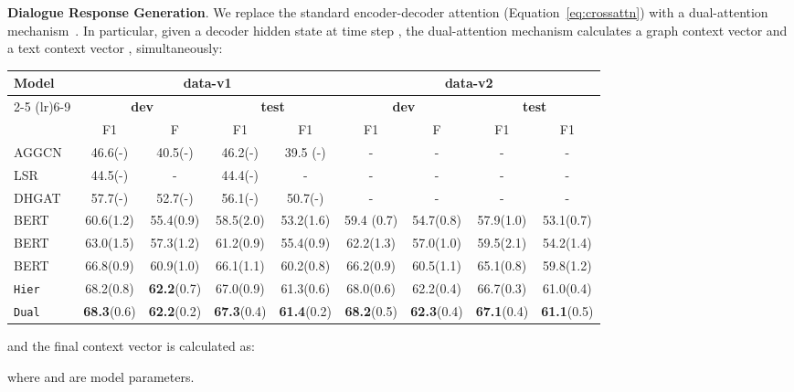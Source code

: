 \documentclass[11pt,a4paper]{article}
\begin{document}
\noindent\textbf{Dialogue Response Generation}.
We replace the standard encoder-decoder attention (Equation~\ref{eq:crossattn}) with a dual-attention mechanism~\cite{song2019semantic}. 
In particular, given a decoder hidden state  at time step , the dual-attention mechanism calculates a graph context vector  and a text context vector , simultaneously:
\begin{table*}[!t]
	\centering
	\small
	\begin{tabular}{lcccccccc}
		\toprule
		\multirow{3}{*}{\textbf{Model}}& \multicolumn{4}{c}{\textbf{data-v1}} &\multicolumn{4}{c}{\textbf{data-v2}} \\
		\cmidrule(lr){2-5} \cmidrule(lr){6-9}
		&\multicolumn{2}{c}{\textbf{dev}} &\multicolumn{2}{c}{\textbf{test}}
		&\multicolumn{2}{c}{\textbf{dev}} 
		&\multicolumn{2}{c}{\textbf{test}} \\
		&F1 &F &F1 &F1
		&F1 &F &F1 &F1\\
		\midrule
AGGCN &46.6(-) &40.5(-) &46.2(-) &39.5 (-) &- &- &- &-\\
		LSR &44.5(-) &- &44.4(-) &- &- &- &- &- \\
		DHGAT &57.7(-) &52.7(-) &56.1(-) &50.7(-) &- &- &- &- \\
		BERT &60.6(1.2) &55.4(0.9) &58.5(2.0) &53.2(1.6) &59.4 (0.7) &54.7(0.8) &57.9(1.0)	&53.1(0.7)\\
		{BERT} &{63.0(1.5)} &{57.3(1.2)} &{61.2(0.9)} &{55.4(0.9)} &62.2(1.3) &57.0(1.0) &59.5(2.1) &54.2(1.4) \\
		\midrule
		\rowcolor{mygray}
		BERT &66.8(0.9) &60.9(1.0) &66.1(1.1) &60.2(0.8) &66.2(0.9) &60.5(1.1) &65.1(0.8) &59.8(1.2) \\
		\rowcolor{mygray}
		\texttt{Hier} &68.2(0.8) &\textbf{62.2}(0.7) &67.0(0.9) &61.3(0.6) &68.0(0.6) &62.2(0.4) &66.7(0.3) &61.0(0.4) \\
		\rowcolor{mygray}
		\texttt{Dual} &\textbf{68.3}(0.6) &\textbf{62.2}(0.2) &\textbf{67.3}(0.4) &\textbf{61.4}(0.2) &\textbf{68.2}(0.5) &\textbf{62.3}(0.4) &\textbf{67.1}(0.4) &\textbf{61.1}(0.5) \\
		\bottomrule
	\end{tabular}
	\caption{Performance on DialogRE, where  denotes the standard deviation computed from 5 runs, and  indicates results reported by~\citet{Chen20Dialogue}.}
	\label{tab:mainRE}
\end{table*}

and the final context vector  is calculated as:

where  and  are model parameters.
\end{document}
